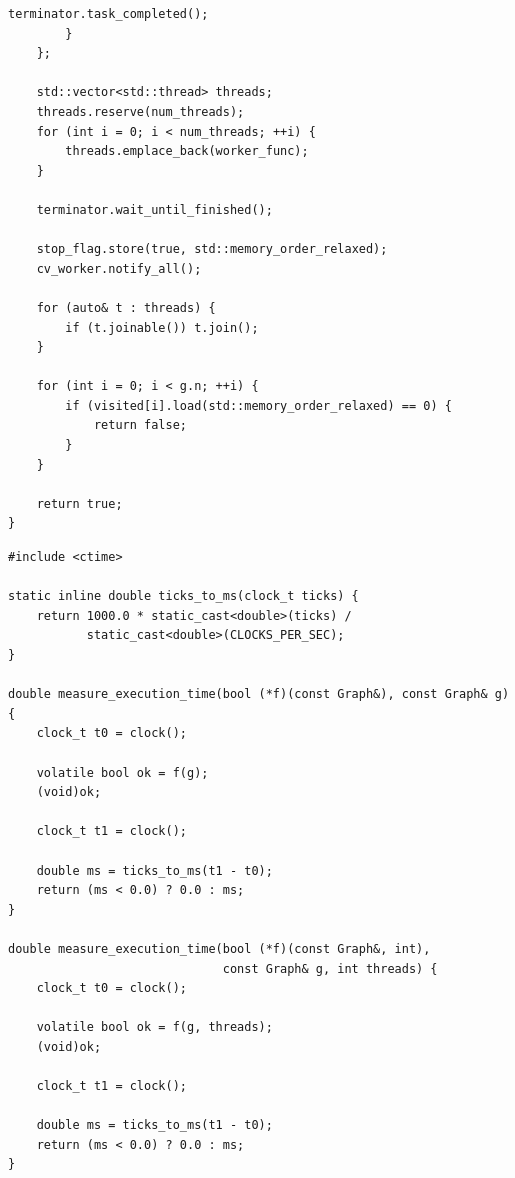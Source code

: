 \begin{lstlisting}[label={lst:conn-par}, caption={Реализация параллельного алгоритма проверки связности (BFS)}]
            terminator.task_completed();
        }
    };

    std::vector<std::thread> threads;
    threads.reserve(num_threads);
    for (int i = 0; i < num_threads; ++i) {
        threads.emplace_back(worker_func);
    }

    terminator.wait_until_finished();

    stop_flag.store(true, std::memory_order_relaxed);
    cv_worker.notify_all();

    for (auto& t : threads) {
        if (t.joinable()) t.join();
    }

    for (int i = 0; i < g.n; ++i) {
        if (visited[i].load(std::memory_order_relaxed) == 0) {
            return false;
        }
    }

    return true;
}
\end{lstlisting}

\clearpage

\begin{lstlisting}[label={lst:cpu-time}, caption={Реализация замеров времени выполнения (clock)}]
#include <ctime>

static inline double ticks_to_ms(clock_t ticks) {
    return 1000.0 * static_cast<double>(ticks) /
           static_cast<double>(CLOCKS_PER_SEC);
}

double measure_execution_time(bool (*f)(const Graph&), const Graph& g) {
    clock_t t0 = clock();

    volatile bool ok = f(g);
    (void)ok;

    clock_t t1 = clock();

    double ms = ticks_to_ms(t1 - t0);
    return (ms < 0.0) ? 0.0 : ms;
}

double measure_execution_time(bool (*f)(const Graph&, int),
                              const Graph& g, int threads) {
    clock_t t0 = clock();

    volatile bool ok = f(g, threads);
    (void)ok;

    clock_t t1 = clock();

    double ms = ticks_to_ms(t1 - t0);
    return (ms < 0.0) ? 0.0 : ms;
}
\end{lstlisting}
